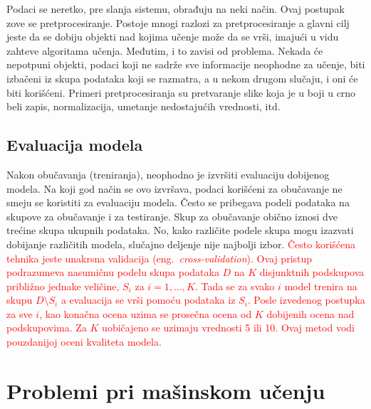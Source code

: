 Podaci se neretko, pre slanja sistemu, obrađuju na neki način. Ovaj postupak zove se pretprocesiranje. Postoje mnogi razlozi za pretprocesiranje a glavni cilj jeste da se dobiju objekti nad kojima učenje može da se vrši, imajući u vidu zahteve algoritama učenja. Međutim, i to zavisi od problema. Nekada će nepotpuni objekti, podaci koji ne sadrže sve informacije neophodne za učenje, biti izbačeni iz skupa podataka koji se razmatra, a u nekom drugom slučaju, i oni će biti korišćeni. Primeri pretprocesiranja su pretvaranje slike koja je u boji u crno beli zapis, normalizacija, umetanje nedostajućih vrednosti, itd.

\subsection{Evaluacija modela}

Nakon obučavanja (treniranja), neophodno je izvršiti evaluaciju dobijenog modela. Na koji god način se ovo izvršava, podaci korišćeni za obučavanje ne smeju se koristiti za evaluaciju modela. Često se pribegava podeli podataka na skupove za obučavanje i za testiranje. Skup za obučavanje obično iznosi dve trećine skupa ukupnih podataka. No, kako različite podele skupa mogu izazvati dobijanje različitih modela, slučajno deljenje nije najbolji izbor. \textcolor{red}{ Često korišćena tehnika jeste unakrsna validacija (eng.~{\em cross-validation}). Ovaj pristup podrazumeva nasumičnu podelu skupa podataka $D$ na $K$ disjunktnih podskupova približno jednake veličine, $S_i$ za $i=1,...,K$. Tada se za svako $i$ model trenira na skupu $D \setminus S_i$ a evaluacija se vrši pomoću podataka iz $S_i$. Posle izvedenog postupka za sve $i$, kao konačna ocena uzima se prosečna ocena od $K$ dobijenih ocena nad podskupovima. Za $K$ uobičajeno se uzimaju vrednosti 5 ili 10. Ovaj metod vodi pouzdanijoj oceni kvaliteta modela.}

\section{Problemi pri mašinskom učenju}


